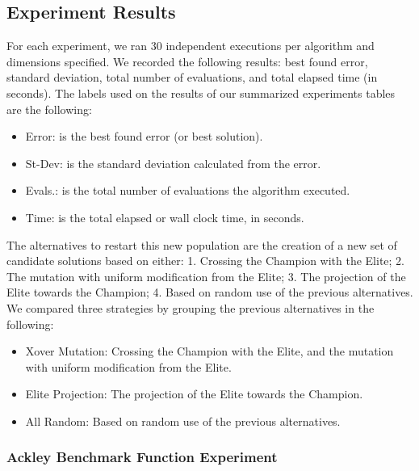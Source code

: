 \documentclass[graybox]{svmult}
\begin{document}
    \subsection{Experiment Results}

        For each experiment, we ran 30 independent executions per algorithm and
        dimensions specified. We recorded the following results: best found error,
        standard deviation, total number of evaluations, and total elapsed time (in
        seconds). The labels used on the results of our summarized experiments tables
        are the following:

        \begin{itemize}
            \item   Error:       is the best found error (or best solution).
            \item   St-Dev:      is the standard deviation calculated from the error. 
            \item   Evals.:      is the total number of evaluations the algorithm executed.
            \item   Time:        is the total elapsed or wall clock time, in seconds. 
        \end{itemize}

        The alternatives to restart this new population are the creation of a new set
        of candidate solutions based on either: 1. Crossing the Champion with the Elite;
        2. The mutation with uniform modification from the Elite; 3. The
        projection of the Elite towards the Champion; 4. Based on random use of the
        previous alternatives. We compared three strategies by grouping the previous
        alternatives in the following:

        \begin{itemize}
            \item   Xover Mutation:      Crossing the Champion with the Elite, and the mutation with uniform modification from the Elite.
            \item   Elite Projection:    The projection of the Elite towards the Champion. 
            \item   All Random:          Based on random use of the previous alternatives.
        \end{itemize}

        \subsubsection{Ackley Benchmark Function Experiment}
\end{document}
